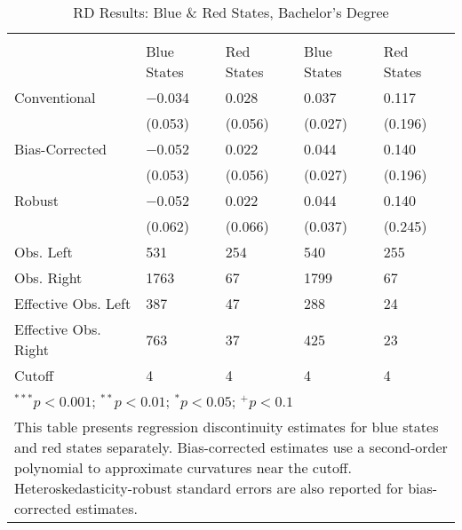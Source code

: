 \begin{table}
\caption{RD Results: Blue \& Red States, Bachelor's Degree}
\centering
\begin{tabularx}{\textwidth}{l>{\centering\arraybackslash}X>{\centering\arraybackslash}X>{\centering\arraybackslash}X>{\centering\arraybackslash}X}
\toprule
  & \multicolumn{2}{c}{Minorities} & \multicolumn{2}{c}{Women} \\
\cmidrule(lr){2-3} \cmidrule(lr){4-5}
 & Blue States & Red States & Blue States & Red States \\
\midrule
Conventional & \num{-0.034} & \num{0.028} & \num{0.037} & \num{0.117}\\
 & (\num{0.053}) & (\num{0.056}) & (\num{0.027}) & (\num{0.196})\\
Bias-Corrected & \num{-0.052} & \num{0.022} & \num{0.044} & \num{0.140}\\
 & (\num{0.053}) & (\num{0.056}) & (\num{0.027}) & (\num{0.196})\\
Robust & \num{-0.052} & \num{0.022} & \num{0.044} & \num{0.140}\\
 & (\num{0.062}) & (\num{0.066}) & (\num{0.037}) & (\num{0.245})\\
\midrule
Obs. Left & \num{531} & \num{254} & \num{540} & \num{255}\\
Obs. Right & \num{1763} & \num{67} & \num{1799} & \num{67}\\
Effective Obs. Left & \num{387} & \num{47} & \num{288} & \num{24}\\
Effective Obs. Right & \num{763} & \num{37} & \num{425} & \num{23}\\
Cutoff & \num{4} & \num{4} & \num{4} & \num{4}\\
\bottomrule
\multicolumn{5}{l}{\scriptsize \rule{0pt}{1em}$^{***}p<0.001$; $^{**}p<0.01$; $^{*}p<0.05$; $^{+}p<0.1$}\\
\multicolumn{5}{p{\textwidth}}{\scriptsize \rule{0pt}{1em}This table presents regression discontinuity estimates for blue states and red states separately. Bias-corrected estimates use a second-order polynomial to approximate curvatures near the cutoff. Heteroskedasticity-robust standard errors are also reported for bias-corrected estimates.}\\
\end{tabularx}
\end{table}